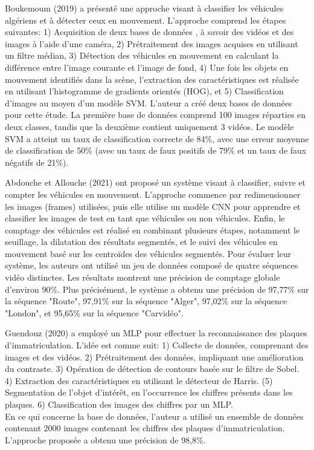 Boukemoum (2019) \cite{boukemoum-master} a présenté une approche visant à classifier les véhicules algériens et à détecter ceux en mouvement. L'approche comprend les étapes suivantes: 1) Acquisition de deux bases de données , à savoir des vidéos et des images à l'aide d'une caméra, 2) Prétraitement des images acquises en utilisant un filtre médian, 3) Détection des véhicules en mouvement en calculant la différence entre l'image courante et l'image de fond, 4) Une fois les objets en mouvement identifiés dans la scène, l'extraction des caractéristiques est réalisée en utilisant l'histogramme de gradients orientés (HOG), et 5) Classification d'images au moyen d'un modèle SVM.
L'auteur a créé deux bases de données pour cette étude. La première base de données comprend 100 images réparties en deux classes, tandis que la deuxième contient uniquement 3 vidéos. Le modèle SVM a atteint un taux de classification correcte de 84\%, avec une erreur moyenne de classification de 50\% (avec un taux de faux positifs de 79\% et un taux de faux négatifs de 21\%).
 


Abdouche et Allouche (2021) \cite{abdouche-memoire} ont proposé un système visant à classifier, suivre et compter les véhicules en mouvement. L'approche commence par redimensionner les images (frames) utilisées, puis elle utilise un modèle CNN pour apprendre et classifier les images de test en tant que véhicules ou non véhicules. Enfin, le comptage des véhicules est réalisé en combinant plusieurs étapes, notamment le seuillage, la dilatation des résultats segmentés, et le suivi des véhicules en mouvement basé sur les centroïdes des véhicules segmentés. Pour évaluer leur système, les auteurs ont utilisé un jeu de données composé de quatre séquences vidéo distinctes. Les résultats montrent une précision de comptage globale d'environ 90\%. Plus précisément, le système a obtenu une précision de 97,77\% sur la séquence "Route", 97,91\% sur la séquence "Alger", 97,02\% sur la séquence "London", et 95,65\% sur la séquence "Carvidéo".


Guendouz (2020) \cite{guendouz-master} a employé un MLP pour effectuer la reconnaissance des plaques d'immatriculation. L'idée est comme suit: 1) Collecte de données, comprenant des images et des vidéos. 2) Prétraitement des données, impliquant une amélioration du contraste. 3) Opération de détection de contours basée sur le filtre de Sobel. 4) Extraction des caractéristiques en utilisant le détecteur de Harris. (5) Segmentation de l'objet d'intérêt, en l'occurrence les chiffres présents dans les plaques. 6) Classification des images des chiffres par un MLP.\\
En ce qui concerne la base de données, l'auteur a utilisé un ensemble de données contenant 2000 images contenant les chiffres des plaques d'immatriculation. L'approche proposée a obtenu une précision de 98,8\%.

